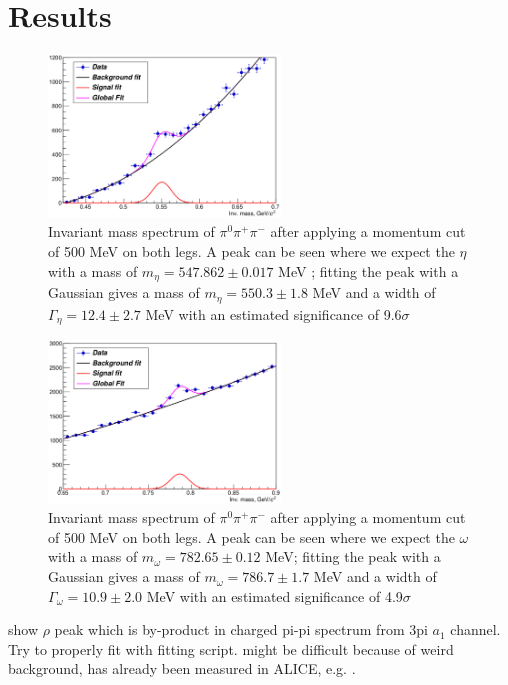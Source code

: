 \section{Results}
\label{sec:Results}

\begin{figure}[t]
	\centering
	\includegraphics[width=0.55\textwidth]{Figures/EtaPeak500MeVlegscut.png}
	\caption{Invariant mass spectrum of $\pi^0\pi^{+}\pi^{-}$ after applying a momentum cut of 500 MeV on both legs. A peak can be seen where we expect the $\eta$ with a mass of $m_{\eta} = 547.862 \pm 0.017$ MeV \cite{PDG2018}; fitting the peak with a Gaussian gives a mass of $m_{\eta} = 550.3 \pm 1.8$ MeV and a width of $\Gamma_{\eta} = 12.4 \pm 2.7$ MeV with an estimated significance of 9.6$\sigma$}
	\label{fig:alpha}
\end{figure}

\begin{figure}[b]
	\centering
	\includegraphics[width=0.55\textwidth]{Figures/OmegaPeak500MeVlegscut.png}
	\caption{Invariant mass spectrum of $\pi^0\pi^{+}\pi^{-}$ after applying a momentum cut of 500 MeV on both legs. A peak can be seen where we expect the $\omega$ with a mass of $m_{\omega} = 782.65 \pm 0.12$ MeV; fitting the peak with a Gaussian gives a mass of $m_{\omega} = 786.7 \pm 1.7$ MeV and a width of $\Gamma_{\omega} = 10.9 \pm 2.0$ MeV with an estimated significance of 4.9$\sigma$}
	\label{fig:alpha}
\end{figure}



show $\rho$ peak which is by-product in charged pi-pi spectrum from 3pi $a_1$ channel. Try to properly fit with fitting script. might be difficult because of weird background, has already been measured in ALICE, e.g. \cite{ALICErho}. \\